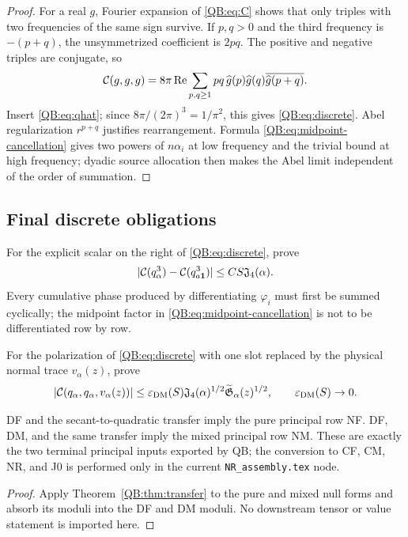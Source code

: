 \begin{proof}
For a real $g$, Fourier expansion of \eqref{QB:eq:C} shows that only triples
with two frequencies of the same sign survive.  If $p,q>0$ and the third
frequency is $-(p+q)$, the unsymmetrized coefficient is $2pq$.
The positive and negative triples are conjugate, so
\begin{equation*}
 \mathcal C(g,g,g)=8\pi\operatorname{Re}
 \sum_{p,q\ge1}pq\,\widehat g(p)\widehat g(q)
 \overline{\widehat g(p+q)}.
\end{equation*}
Insert \eqref{QB:eq:qhat}; since
$8\pi/(2\pi)^3=1/\pi^2$, this gives \eqref{QB:eq:discrete}.
Abel regularization $r^{p+q}$ justifies rearrangement.  Formula
\eqref{QB:eq:midpoint-cancellation} gives two powers of $n\alpha_i$ at low
frequency and the trivial bound at high frequency; dyadic source
allocation then makes the Abel limit independent of the order of
summation.
\end{proof}

\subsection{Final discrete obligations}

\begin{obligation}
\label{QB:obl:DF}
For the explicit scalar on the right of \eqref{QB:eq:discrete}, prove
\begin{equation}\label{QB:eq:DF}
 |\mathcal C(q_\alpha^3)-\mathcal C(q_{a\mathbf1}^3)|
 \le CS\mathfrak J_4(\alpha).
\end{equation}
Every cumulative phase produced by differentiating $\varphi_i$ must first
be summed cyclically; the midpoint factor in
\eqref{QB:eq:midpoint-cancellation} is not to be differentiated row by row.
\end{obligation}

\begin{obligation}
\label{QB:obl:DM}
For the polarization of \eqref{QB:eq:discrete} with one slot replaced by the
physical normal trace $v_\alpha(z)$, prove
\begin{equation}\label{QB:eq:DM}
 |\mathcal C(q_\alpha,q_\alpha,v_\alpha(z))|
 \le\varepsilon_{\rm DM}(S)\mathfrak J_4(\alpha)^{1/2}
 \widetilde{\mathfrak G}_\alpha(z)^{1/2},
 \qquad \varepsilon_{\rm DM}(S)\to0.
\end{equation}
\end{obligation}

\begin{proposition}[Equivalence]
\label{QB:prop:equivalence}
DF and the secant-to-quadratic transfer imply the pure principal row NF.
DF, DM, and the same transfer imply the mixed principal row NM.  These are
exactly the two terminal principal inputs exported by QB; the conversion
to CF, CM, NR, and J0 is performed only in the current
\texttt{NR\_assembly.tex} node.
\end{proposition}

\begin{proof}
Apply Theorem~\ref{QB:thm:transfer} to the pure and mixed null forms and absorb
its moduli into the DF and DM moduli.  No downstream tensor or value
statement is imported here.
\end{proof}
\endgroup
